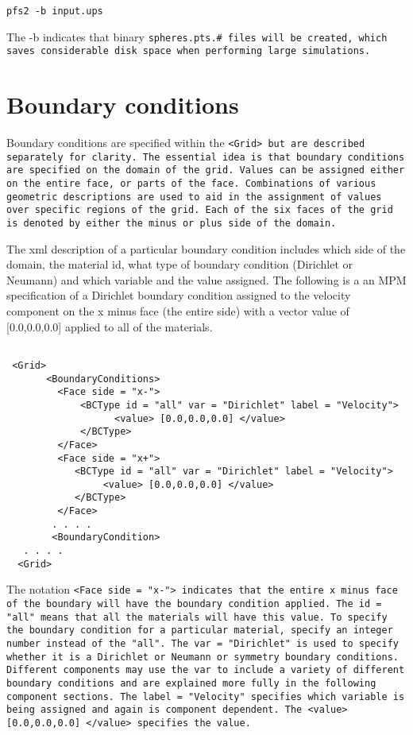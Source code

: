 \begin{Verbatim}[fontsize=\footnotesize]
   pfs2 -b input.ups
\end{Verbatim}

The -b indicates that binary \tt spheres.pts.\# \normalfont files will be created, which
saves considerable disk space when performing large simulations.


\section{Boundary conditions}

Boundary conditions are specified within the \tt <Grid> \normalfont
but are described separately for clarity.  The essential idea is that
boundary conditions are specified on the domain of the grid.  Values
can be assigned either on the entire face, or parts of the face.
Combinations of various geometric descriptions are used to aid in the
assignment of values over specific regions of the grid.  Each of the
six faces of the grid is denoted by either the minus or plus side of
the domain.

The xml description of a particular boundary condition includes which
side of the domain, the material id, what type of boundary condition
(Dirichlet or Neumann) and which variable and the value assigned.  The
following is a an MPM specification of a Dirichlet boundary condition
assigned to the velocity component on the x minus face (the entire
side) with a vector value of [0.0,0.0,0.0] applied to all of the materials.

\begin{Verbatim}[fontsize=\footnotesize]

 <Grid>
       <BoundaryConditions>
         <Face side = "x-">
             <BCType id = "all" var = "Dirichlet" label = "Velocity">
                   <value> [0.0,0.0,0.0] </value>
             </BCType>
         </Face>
         <Face side = "x+">
            <BCType id = "all" var = "Dirichlet" label = "Velocity">
                 <value> [0.0,0.0,0.0] </value>
            </BCType>
         </Face>
        . . . .
        <BoundaryCondition>
   . . . .
  <Grid>

\end{Verbatim}

The notation \tt <Face side = "x-"> \normalfont indicates that the
entire x minus face of the boundary will have the boundary condition
applied.  The \tt id = "all" \normalfont means that all the
materials will have this value.  To specify the boundary condition for
a particular material, specify an integer number instead of the
"all".  The \tt var = "Dirichlet" \normalfont is used to specify
whether it is a Dirichlet or Neumann or symmetry boundary conditions.
Different components may use the \tt var \normalfont to include a
variety of different boundary conditions and are explained more fully
in the following component sections.  The \tt label = "Velocity"
\normalfont specifies which variable is being assigned and again is
component dependent.  The \tt <value> [0.0,0.0,0.0] </value>
\normalfont specifies the value.

